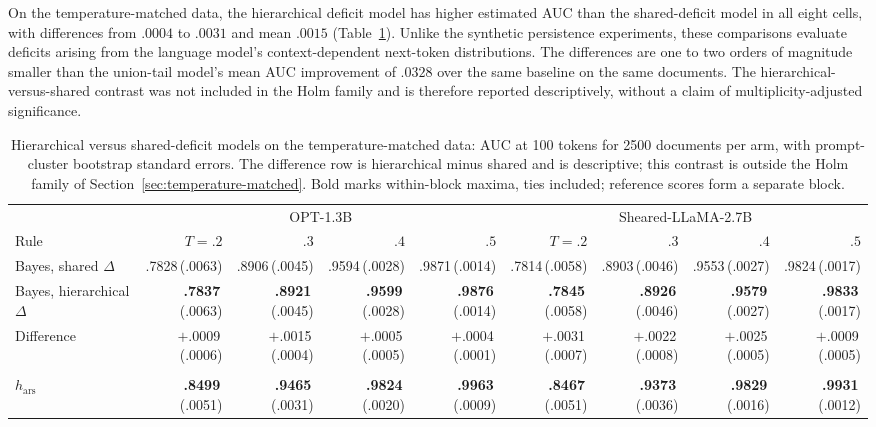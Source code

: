 \documentclass[11pt]{article}
\newcommand{\mcse}[2]{\mbox{#1\,{\fontsize{7}{8}\selectfont(#2)}}}
\newcommand{\bestmcse}[2]{\mbox{\textbf{#1}\,{\fontsize{7}{8}\selectfont(#2)}}}
\begin{document}
On the temperature-matched data, the hierarchical deficit model has higher
estimated AUC than the shared-deficit model in all eight cells, with differences
from $.0004$ to $.0031$ and mean $.0015$ (Table~\ref{tab:pooled-real}).  Unlike the
synthetic persistence experiments, these comparisons evaluate deficits arising
from the language model's context-dependent next-token distributions.  The
differences are one to two orders of magnitude smaller than the union-tail
model's mean AUC improvement of $.0328$ over the same baseline on the same
documents.  The hierarchical-versus-shared contrast was not included in the
Holm family and is therefore reported descriptively, without a claim of
multiplicity-adjusted significance.

\begin{table}[htbp]
\centering
\scriptsize
\setlength{\tabcolsep}{2.6pt}%
\caption{Hierarchical versus shared-deficit models on the temperature-matched data: AUC at 100 tokens for 2500 documents per arm, with prompt-cluster bootstrap standard errors.  The difference row is hierarchical minus shared and is descriptive; this contrast is outside the Holm family of Section~\ref{sec:temperature-matched}.  Bold marks within-block maxima, ties included; reference scores form a separate block.}
\label{tab:pooled-real}
\begin{tabular}{@{}lrrrrrrrr@{}}
\toprule
& \multicolumn{4}{c}{OPT-1.3B} & \multicolumn{4}{c}{Sheared-LLaMA-2.7B} \\
\cmidrule(lr){2-5}\cmidrule(lr){6-9}
Rule & $T{=}.2$ & $.3$ & $.4$ & $.5$ & $T{=}.2$ & $.3$ & $.4$ & $.5$ \\
\midrule
Bayes, shared $\Delta$ & \mcse{.7828}{.0063} & \mcse{.8906}{.0045} & \mcse{.9594}{.0028} & \mcse{.9871}{.0014} & \mcse{.7814}{.0058} & \mcse{.8903}{.0046} & \mcse{.9553}{.0027} & \mcse{.9824}{.0017} \\
Bayes, hierarchical $\Delta$ & \bestmcse{.7837}{.0063} & \bestmcse{.8921}{.0045} & \bestmcse{.9599}{.0028} & \bestmcse{.9876}{.0014} & \bestmcse{.7845}{.0058} & \bestmcse{.8926}{.0046} & \bestmcse{.9579}{.0027} & \bestmcse{.9833}{.0017} \\
\addlinespace
Difference & $+$\mcse{.0009}{.0006} & $+$\mcse{.0015}{.0004} & $+$\mcse{.0005}{.0005} & $+$\mcse{.0004}{.0001} & $+$\mcse{.0031}{.0007} & $+$\mcse{.0022}{.0008} & $+$\mcse{.0025}{.0005} & $+$\mcse{.0009}{.0005} \\
\addlinespace
\multicolumn{9}{@{}l}{\textit{Reference scores}}\\
$h_{\mathrm{ars}}$ & \bestmcse{.8499}{.0051} & \bestmcse{.9465}{.0031} & \bestmcse{.9824}{.0020} & \bestmcse{.9963}{.0009} & \bestmcse{.8467}{.0051} & \bestmcse{.9373}{.0036} & \bestmcse{.9829}{.0016} & \bestmcse{.9931}{.0012} \\

\end{tabular}
\end{table}
\end{document}
